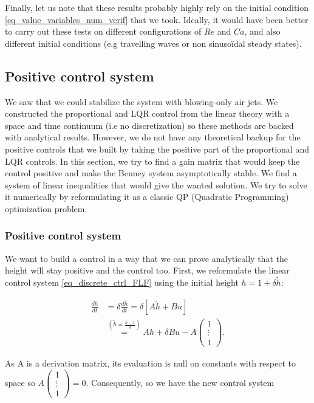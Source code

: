 \documentclass[12pt]{article}
\begin{document}
Finally, let us note that these results probably highly rely on the initial condition \eqref{eq_value_variables_num_verif}
that we took. Ideally, it would have been better to carry out these tests on different configurations of 
$Re$ and $Ca$, and also different initial conditions (e.g travelling waves or non sinusoïdal steady states).  

\subsection{Positive control system}
We saw that we could stabilize the system with blowing-only air jets. We constructed the
proportional and LQR control from the linear theory with a space and time continuum 
(i.e no discretization) so these methods are backed with analytical results. However,
we do not have any theoretical backup for the positive controls that we built by taking 
the positive part of the proportional and LQR controls. In this section, we try to find a 
gain matrix that would keep the control positive and make the Benney system asymptotically 
stable. We find a system of linear inequalities that would give the wanted solution. We try 
to solve it numerically by reformulating it as a classic QP (Quadratic Programming) optimization
problem.


\subsubsection{Positive control system}

We want to build a control in a way that we can prove analytically that the height will stay positive and the control too. First, we reformulate the linear control system \eqref{eq_discrete_ctrl_FLF} using the initial height $h = 1 + \delta \tilde{h}$:

\begin{align}
    \frac{dh}{dt} &= \delta\frac{d\tilde{h}}{dt} = \delta \left[ A\tilde{h} + Bu\right] \\
    &\stackrel{(\tilde{h}=\frac{h-1}{\delta})}{=} Ah + \delta Bu - A \begin{pmatrix}
        1 \\ \vdots \\ 1
    \end{pmatrix} .
\end{align}

As A is a derivation matrix, its evaluation is null on constants with respect to space so
$A \begin{pmatrix}
        1 \\ \vdots \\ 1
\end{pmatrix} =0$. Consequently, so we have the new control system
\end{document}
